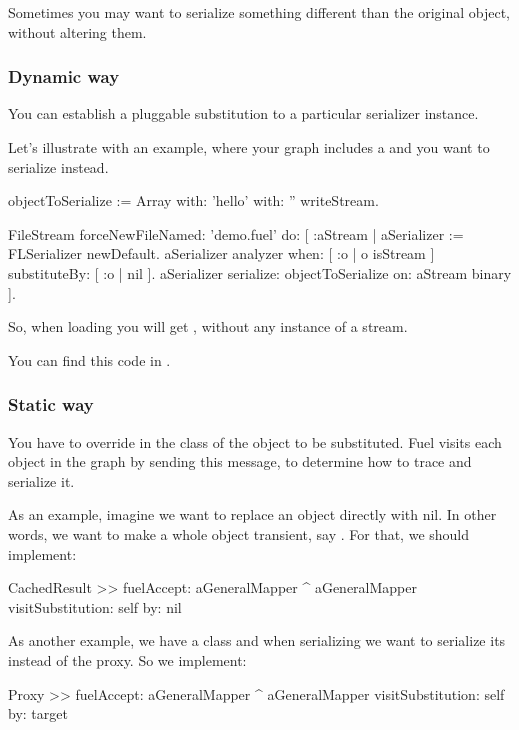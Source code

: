 \documentclass[a4paper,10pt,twoside]{book}
\begin{document}
Sometimes you may want to serialize something different than the original object, without altering them.


\subsubsection{Dynamic way}

You can establish a pluggable substitution to a particular serializer instance. 

Let's illustrate with an example, where your graph includes a  and you want to serialize  instead. 

\begin{code}
objectToSerialize := Array with: 'hello' with: '' writeStream.

FileStream forceNewFileNamed: 'demo.fuel' do: [ :aStream |
    aSerializer := FLSerializer newDefault.
    aSerializer analyzer 
        when: [ :o | o isStream ] 
        substituteBy: [ :o | nil ].
    aSerializer         
        serialize: objectToSerialize
        on: aStream binary ].
\end{code}

So, when loading you will get , without any instance of a stream.

You can find this code in .


\subsubsection{Static way}

You have to override  in the class of the object to be substituted. Fuel visits each object in the graph by sending this message, to determine how to trace and serialize it.

As an example, imagine we want to replace an object directly with nil. In other words, we want to make a whole object transient, say . For that, we should implement:

\begin{code}
CachedResult >> fuelAccept: aGeneralMapper
    ^ aGeneralMapper visitSubstitution: self by: nil
\end{code}

As another example, we have a  class and when serializing we want to serialize its  instead of the proxy. So we implement:

\begin{code}
Proxy >> fuelAccept: aGeneralMapper
    ^ aGeneralMapper visitSubstitution: self by: target
\end{code}
\end{document}
